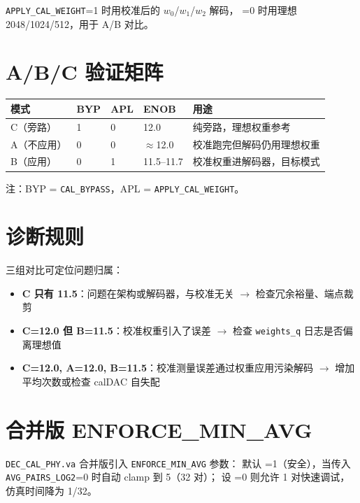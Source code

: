 \documentclass[UTF8,a4paper,11pt,twoside]{ctexrep}
\begin{document}
\texttt{APPLY\_CAL\_WEIGHT}=1 时用校准后的 $w_0$/$w_1$/$w_2$ 解码，
=0 时用理想 2048/1024/512，用于 A/B 对比。

\section{A/B/C 验证矩阵}

\begin{table}[ht]\centering\footnotesize
\begin{tabular}{p{1.8cm}p{1.2cm}p{1.2cm}p{1.5cm}p{5.0cm}}
\toprule
\textbf{模式} & \textbf{BYP} & \textbf{APL} & \textbf{ENOB} & \textbf{用途} \\
\hline
C（旁路） & 1 & 0 & 12.0 & 纯旁路，理想权重参考 \\
A（不应用） & 0 & 0 & $\approx$12.0 & 校准跑完但解码仍用理想权重 \\
B（应用） & 0 & 1 & 11.5--11.7 & 校准权重进解码器，目标模式 \\
\bottomrule
\end{tabular}
\end{table}

\noindent\footnotesize 注：BYP = \texttt{CAL\_BYPASS}，APL = \texttt{APPLY\_CAL\_WEIGHT}。

\section{诊断规则}

三组对比可定位问题归属：

\begin{itemize}
\item \textbf{C 只有 11.5}：问题在架构或解码器，与校准无关
      $\to$ 检查冗余裕量、端点裁剪
\item \textbf{C=12.0 但 B=11.5}：校准权重引入了误差
      $\to$ 检查 \texttt{weights\_q} 日志是否偏离理想值
\item \textbf{C=12.0, A=12.0, B=11.5}：校准测量误差通过权重应用污染解码
      $\to$ 增加平均次数或检查 calDAC 自失配
\end{itemize}

\section{合并版 ENFORCE\_MIN\_AVG}

\texttt{DEC\_CAL\_PHY.va} 合并版引入 \texttt{ENFORCE\_MIN\_AVG} 参数：
默认 =1（安全），当传入 \texttt{AVG\_PAIRS\_LOG2}=0 时自动 clamp 到 5（32 对）；
设 =0 则允许 1 对快速调试，仿真时间降为 1/32。
\end{document}
